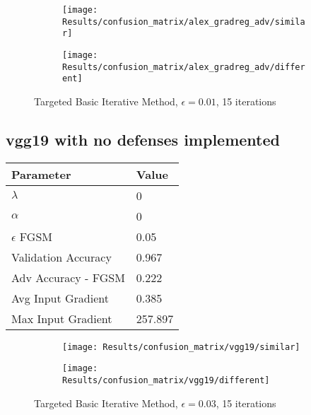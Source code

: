 \documentclass[draft,final]{vutinfth} %
\begin{document}
\begin{figure}[h]
  \begin{subfigure}[b]{0.75\columnwidth}
		\centering
    \texttt{[image: Results/confusion\_matrix/alex\_gradreg\_adv/similar]}%
    \label{fig:exp:cm:alex_gradreg_adv:similar}
  \end{subfigure}
  \begin{subfigure}[b]{0.75\columnwidth}
		\centering
    \texttt{[image: Results/confusion\_matrix/alex\_gradreg\_adv/different]}
    \label{fig:exp:cm:alex_gradreg_adv:different}
  \end{subfigure}
  \caption{Targeted Basic Iterative Method, $\epsilon = 0.01$, 15 iterations}
  \label{fig:intro} %
\end{figure}



\subsection{vgg19 with no defenses implemented}

\begin{table}[h]
  \centering
  \begin{tabular}{ll}
    \toprule
			Parameter			& Value   \\
    \midrule
			$\lambda$								& 0				\\
			$\alpha$								& 0				\\
			$\epsilon$ FGSM					& 0.05		\\
			
			Validation Accuracy			& 0.967		\\ 
			Adv Accuracy - FGSM			& 0.222		\\
			
			Avg Input Gradient			& 0.385	\\
			Max Input Gradient			& 257.897\\
    \bottomrule
  \end{tabular}
\end{table}


\begin{figure}[h]
  \begin{subfigure}[b]{0.75\columnwidth}
		\centering
    \texttt{[image: Results/confusion\_matrix/vgg19/similar]}
    \label{fig:exp:cm:vgg19:similar}
  \end{subfigure}
  \begin{subfigure}[b]{0.75\columnwidth}
		\centering
    \texttt{[image: Results/confusion\_matrix/vgg19/different]}
    \label{fig:exp:cm:vgg19:different}
  \end{subfigure}
  \caption{Targeted Basic Iterative Method, $\epsilon = 0.03$, 15 iterations}
  \label{fig:exp:cm:vgg19}
\end{figure}
\end{document}

